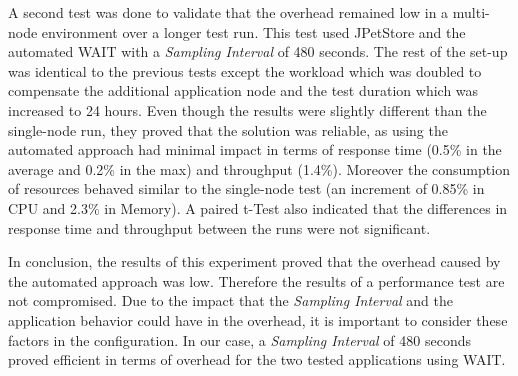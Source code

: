 \documentclass[runningheads,a4paper]{llncs}
\begin{document}

A second test was done to validate that the overhead remained low in a
multi-node environment over a longer test run. This test used JPetStore and the
automated WAIT with a \emph{Sampling Interval} of 480 seconds. The rest of the
set-up was identical to the previous tests except the workload which was doubled
to compensate the additional application node and the test duration which was
increased to 24 hours. Even though the results were slightly different than the
single-node run, they proved that the solution was reliable, as using the
automated approach had minimal impact in terms of response time (0.5\% in the
average and 0.2\% in the max) and throughput (1.4\%). Moreover the consumption
of resources behaved similar to the single-node test (an increment of 0.85\% in
CPU and 2.3\% in Memory). A paired t-Test also indicated
that the differences in response time and throughput between the runs were
not significant.


In conclusion, the results of this experiment proved that the
overhead caused by the automated approach was low. Therefore the results of a
performance test are not compromised. Due to the impact that the \emph{Sampling
Interval} and the application behavior could have in the overhead, it is important to 
consider these factors in the configuration. In our case, a \emph{Sampling
Interval} of 480 seconds proved efficient in terms of overhead for the two tested applications using WAIT.
\end{document}
